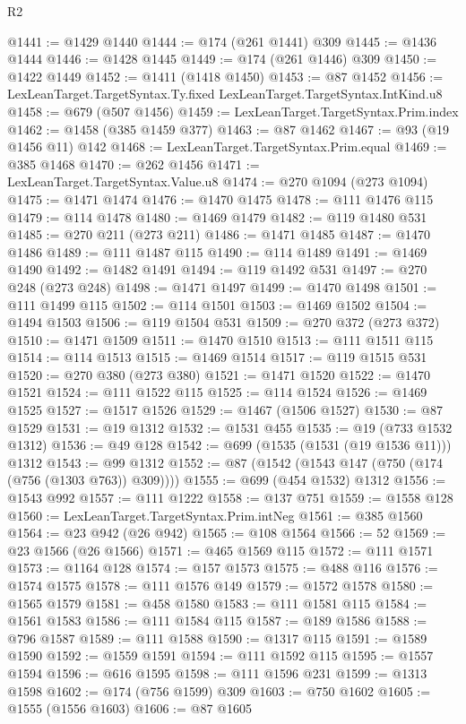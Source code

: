 \begin{lexlean}{R2}
\begin{coremodule}
{{{{{{{{{{{{{{{{{{{{{{{{{{{{{{{{{{{{{{{{{{{{{{{{{{{{{{{{{{{{{{{{{{{{{{{{{{{{{{{{{{{{{{{{{{{{{{{{{{{{{{{{{{{{{{{{{{{{{{{{{{{{{{{{{{{{{{{{{{{{@1441 := @1429 @1440
@1444 := @174 (@261 @1441) @309
@1445 := @1436 @1444
@1446 := @1428 @1445
@1449 := @174 (@261 @1446) @309
@1450 := @1422 @1449
@1452 := @1411 (@1418 @1450)
@1453 := @87 @1452
@1456 := LexLeanTarget.TargetSyntax.Ty.fixed LexLeanTarget.TargetSyntax.IntKind.u8
@1458 := @679 (@507 @1456)
@1459 := LexLeanTarget.TargetSyntax.Prim.index
@1462 := @1458 (@385 @1459 @377)
@1463 := @87 @1462
@1467 := @93 (@19 @1456 @11) @142
@1468 := LexLeanTarget.TargetSyntax.Prim.equal
@1469 := @385 @1468
@1470 := @262 @1456
@1471 := LexLeanTarget.TargetSyntax.Value.u8
@1474 := @270 @1094 (@273 @1094)
@1475 := @1471 @1474
@1476 := @1470 @1475
@1478 := @111 @1476 @115
@1479 := @114 @1478
@1480 := @1469 @1479
@1482 := @119 @1480 @531
@1485 := @270 @211 (@273 @211)
@1486 := @1471 @1485
@1487 := @1470 @1486
@1489 := @111 @1487 @115
@1490 := @114 @1489
@1491 := @1469 @1490
@1492 := @1482 @1491
@1494 := @119 @1492 @531
@1497 := @270 @248 (@273 @248)
@1498 := @1471 @1497
@1499 := @1470 @1498
@1501 := @111 @1499 @115
@1502 := @114 @1501
@1503 := @1469 @1502
@1504 := @1494 @1503
@1506 := @119 @1504 @531
@1509 := @270 @372 (@273 @372)
@1510 := @1471 @1509
@1511 := @1470 @1510
@1513 := @111 @1511 @115
@1514 := @114 @1513
@1515 := @1469 @1514
@1517 := @119 @1515 @531
@1520 := @270 @380 (@273 @380)
@1521 := @1471 @1520
@1522 := @1470 @1521
@1524 := @111 @1522 @115
@1525 := @114 @1524
@1526 := @1469 @1525
@1527 := @1517 @1526
@1529 := @1467 (@1506 @1527)
@1530 := @87 @1529
@1531 := @19 @1312
@1532 := @1531 @455
@1535 := @19 (@733 @1532 @1312)
@1536 := @49 @128
@1542 := @699 (@1535 (@1531 (@19 @1536 @11))) @1312
@1543 := @99 @1312
@1552 := @87 (@1542 (@1543 @147 (@750 (@174 (@756 (@1303 @763)) @309))))
@1555 := @699 (@454 @1532) @1312
@1556 := @1543 @992
@1557 := @111 @1222
@1558 := @137 @751
@1559 := @1558 @128
@1560 := LexLeanTarget.TargetSyntax.Prim.intNeg
@1561 := @385 @1560
@1564 := @23 @942 (@26 @942)
@1565 := @108 @1564
@1566 := 52
@1569 := @23 @1566 (@26 @1566)
@1571 := @465 @1569 @115
@1572 := @111 @1571
@1573 := @1164 @128
@1574 := @157 @1573
@1575 := @488 @116
@1576 := @1574 @1575
@1578 := @111 @1576 @149
@1579 := @1572 @1578
@1580 := @1565 @1579
@1581 := @458 @1580
@1583 := @111 @1581 @115
@1584 := @1561 @1583
@1586 := @111 @1584 @115
@1587 := @189 @1586
@1588 := @796 @1587
@1589 := @111 @1588
@1590 := @1317 @115
@1591 := @1589 @1590
@1592 := @1559 @1591
@1594 := @111 @1592 @115
@1595 := @1557 @1594
@1596 := @616 @1595
@1598 := @111 @1596 @231
@1599 := @1313 @1598
@1602 := @174 (@756 @1599) @309
@1603 := @750 @1602
@1605 := @1555 (@1556 @1603)
@1606 := @87 @1605
}}}}}}}}}}}}}}}}}}}}}}}}}}}}}}}}}}}}}}}}}}}}}}}}}}}}}}}}}}}}}}}}}}}}}}}}}}}}}}}}}}}}}}}}}}}}}}}}}}}}}}}}}}}}}}}}}}}}}}}}}}}}}}}}}}}}}}}}}}}}
\end{coremodule}
\end{lexlean}

